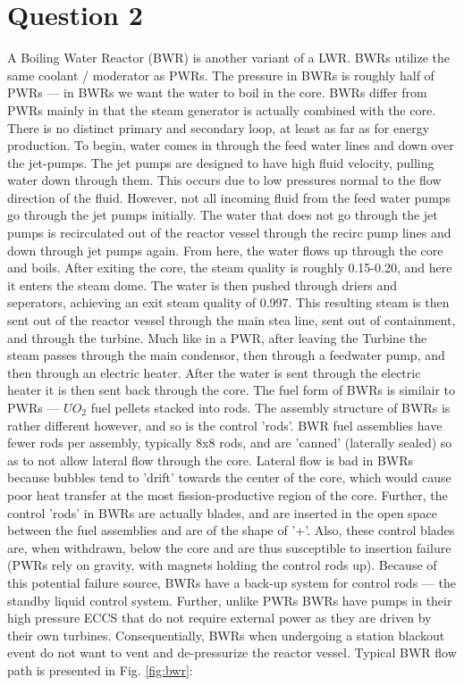 \documentclass{article}
\begin{document}
\newpage
\section*{Question 2}

A Boiling Water Reactor (BWR) is another variant of a LWR. BWRs utilize the same coolant / moderator as PWRs. The pressure in BWRs is roughly half of PWRs --- in BWRs we want the water to boil in the core. BWRs differ from PWRs mainly in that the steam generator is actually combined with the core. There is no distinct primary and secondary loop, at least as far as for energy production. To begin, water comes in through the feed water lines and down over the jet-pumps. The jet pumps are designed to have high fluid velocity, pulling water down through them. This occurs due to low pressures normal to the flow direction of the fluid. However, not all incoming fluid from the feed water pumps go through the jet pumps initially. The water that does not go through the jet pumps is recirculated out of the reactor vessel through the recirc pump lines and down through jet pumps again. From here, the water flows up through the core and boils. After exiting the core, the steam quality is roughly 0.15-0.20, and here it enters the steam dome. The water is then pushed through driers and seperators, achieving an exit steam quality of 0.997. This resulting steam is then sent out of the reactor vessel through the main stea line, sent out of containment, and through the turbine. Much like in a PWR, after leaving the Turbine the steam passes through the main condensor, then through a feedwater pump, and then through an electric heater. After the water is sent through the electric heater it is then sent back through the core. The fuel form of BWRs is similair to PWRs --- $UO_2$ fuel pellets stacked into rods. The assembly structure of BWRs is rather different however, and so is the control 'rods'. BWR fuel assemblies have fewer rods per assembly, typically 8x8 rods, and are 'canned' (laterally sealed) so as to not allow lateral flow through the core. Lateral flow is bad in BWRs because bubbles tend to 'drift' towards the center of the core, which would cause poor heat transfer at the most fission-productive region of the core. Further, the control 'rods' in BWRs are actually blades, and are inserted in the open space between the fuel assemblies and are of the shape of '+'. Also, these control blades are, when withdrawn, below the core and are thus susceptible to insertion failure (PWRs rely on gravity, with magnets holding the control rods up). Because of this potential failure source, BWRs have a back-up system for control rods --- the standby liquid control system. Further, unlike PWRs BWRs have pumps in their high pressure ECCS that do not require external power as they are driven by their own turbines. Consequentially, BWRs when undergoing a station blackout event do not want to vent and de-pressurize the reactor vessel. Typical BWR flow path is presented in Fig. \ref{fig:bwr}:
\end{document}
